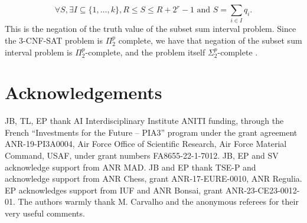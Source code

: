 \documentclass{article}
\theoremstyle{plain}
\theoremstyle{definition}
\begin{document}
\begin{appendices}
\begin{equation*}
    \forall S, \exists I \subseteq \{1, \ldots, k\}, R \leq S \leq R + 2^r - 1 \text{ and } S = \sum_{i \in I} q_i.
\end{equation*}
This is the negation of the truth value of the subset sum interval problem. Since the 3-CNF-SAT problem is $\Pi_2^p$ complete, we have that negation of the subset sum interval problem is $\Pi_2^p$-complete, and the problem itself $\Sigma_2^p$-complete \cite[Section 5.1]{arora2009computational}.

\section*{Acknowledgements}
JB, TL, EP thank AI Interdisciplinary Institute ANITI funding, through the French ``Investments for the Future -- PIA3'' program under the grant agreement ANR-19-PI3A0004, Air Force Office of Scientific Research, Air Force Material Command, USAF, under grant numbers FA8655-22-1-7012. JB, EP and SV acknowledge support from ANR MAD. JB and EP thank TSE-P and acknowledge support from ANR Chess, grant ANR-17-EURE-0010, ANR Regulia. EP acknowledges support from IUF and ANR Bonsai, grant ANR-23-CE23-0012-01.
{The authors warmly thank M. Carvalho and the anonymous referees for their very useful comments.}








\end{appendices}



\end{document}
